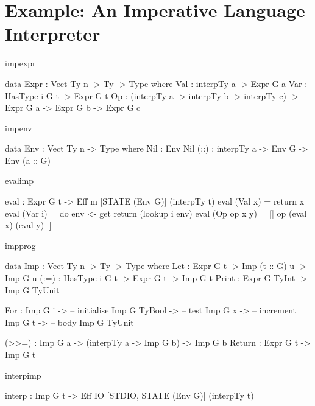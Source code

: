 \section{Example: An Imperative Language Interpreter}

\label{sect:impint}

\begin{SaveVerbatim}{impexpr}

data Expr : Vect Ty n -> Ty -> Type where
     Val : interpTy a -> Expr G a
     Var : HasType i G t -> Expr G t
     Op  : (interpTy a -> interpTy b -> interpTy c) ->
            Expr G a -> Expr G b -> Expr G c

\end{SaveVerbatim}

\begin{SaveVerbatim}{impenv}

data Env : Vect Ty n -> Type where
     Nil  : Env Nil
     (::) : interpTy a -> Env G -> Env (a :: G)

\end{SaveVerbatim}

\begin{SaveVerbatim}{evalimp}

eval : Expr G t -> Eff m [STATE (Env G)] (interpTy t)
eval (Val x) = return x
eval (Var i) = do env <- get
                  return (lookup i env) 
eval (Op op x y) = [| op (eval x) (eval y) |]

\end{SaveVerbatim}

\begin{SaveVerbatim}{impprog}

data Imp    : Vect Ty n -> Ty -> Type where
     Let    : Expr G t -> Imp (t :: G) u -> Imp G u
     (:=)   : HasType i G t -> Expr G t -> Imp G t
     Print  : Expr G TyInt -> Imp G TyUnit

     For    : Imp G i -> -- initialise
              Imp G TyBool -> -- test
              Imp G x -> -- increment
              Imp G t -> -- body
              Imp G TyUnit

     (>>=)  : Imp G a -> 
              (interpTy a -> Imp G b) -> Imp G b 
     Return : Expr G t -> Imp G t

\end{SaveVerbatim}

\begin{SaveVerbatim}{interpimp}

interp : Imp G t -> 
         Eff IO [STDIO, STATE (Env G)] (interpTy t)

\end{SaveVerbatim}

